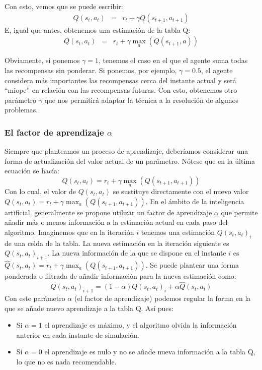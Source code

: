 \documentclass{article}
\begin{document}
Con esto, vemos que se puede escribir:
\begin{eqnarray*}
Q(s_t,a_t) &=& r_t + \gamma 
Q(s_{t+1},a_{t+1}) 
\end{eqnarray*}
E, igual que antes, obtenemos una estimación de la tabla Q:
\begin{eqnarray*}
Q(s_t,a_t) &=& r_t + \gamma 
\max_a(Q(s_{t+1},a))
\end{eqnarray*}

Obviamente, si ponemos $\gamma=1$, tenemos el caso en el que el agente suma todas las recompensas sin ponderar. Si ponemos, por ejemplo, $\gamma=0.5$, el agente considera más importantes las recompensas cerca del instante actual y será ``miope'' en relación con las recompensas futuras. Con esto, obtenemos otro parámetro $\gamma$ que nos permitirá adaptar la técnica a la resolución de algunos problemas.

\subsubsection{El factor de aprendizaje $\alpha$}
Siempre que planteamos un proceso de aprendizaje, deberíamos considerar una forma de actualización del valor actual de un parámetro. Nótese que en la última ecuación se hacía:
\begin{equation*}
Q(s_t,a_t) = r_t + \gamma 
\max_a(Q(s_{t+1},a_{t+1}))
\end{equation*}
Con lo cual, el valor de $Q(s_t,a_t)$ se sustituye directamente con el nuevo valor $Q(s_t,a_t) = r_t + \gamma 
\max_a(Q(s_{t+1},a_{t+1}))$. En el ámbito de la inteligencia artificial, generalmente se propone utilizar un factor de aprendizaje $\alpha$ que permite añadir más o menos información a la estimación actual en cada paso del algoritmo. Imaginemos que en la iteración $i$ tenemos una estimación $Q(s_t,a_t)_i$ de una celda de la tabla. La nueva estimación en la iteración siguiente es $Q(s_t,a_t)_{i+1}$. La nueva información de la que se dispone en el instante $i$ es $\hat{Q}(s_t,a_t) = r_t + \gamma 
\max_a(Q(s_{t+1},a_{t+1}))$. Se puede plantear una forma ponderada o filtrada de añadir información para la nueva estimación como:
\begin{equation}\label{eq:learning_rate}
Q(s_t,a_t)_{i+1} = (1-\alpha) Q(s_t,a_t)_{i} + \alpha \hat{Q}(s_t,a_t)
\end{equation}
Con este parámetro $\alpha$ (el factor de aprendizaje) podemos regular la forma en la que se añade nuevo aprendizaje a la tabla Q. Así pues:
\begin{itemize}
    \item Si $\alpha=1$ el aprendizaje es máximo, y el algoritmo olvida la información anterior en cada instante de simulación.
    \item Si $\alpha=0$ el aprendizaje es nulo y no se añade nueva información a la tabla Q, lo que no es nada recomendable.
\end{itemize}
\end{document}

